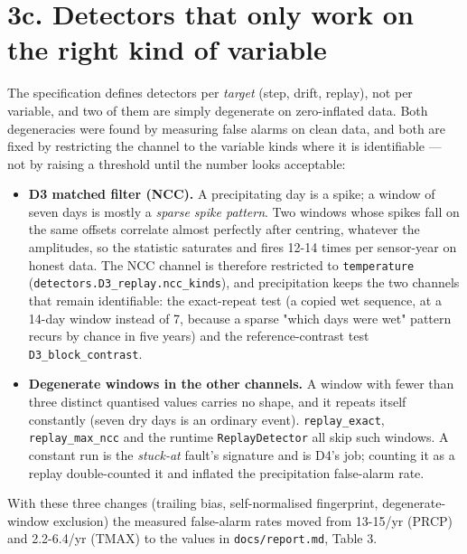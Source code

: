 \documentclass[10pt,a4paper]{article}
\begin{document}
\section*{3c. Detectors that only work on the right kind of variable}
The specification defines detectors per \emph{target} (step, drift, replay), not per variable, and two of them are simply degenerate on zero-\allowbreak{}inflated data. Both degeneracies were found by measuring false alarms on clean data, and both are fixed by restricting the channel to the variable kinds where it is identifiable — not by raising a threshold until the number looks acceptable:

\begin{itemize}
\item \textbf{D3 matched filter (NCC).} A precipitating day is a spike; a window of seven
days is mostly a \emph{sparse spike pattern}. Two windows whose spikes fall on the same offsets correlate almost perfectly after centring, whatever the amplitudes, so the statistic saturates and fires 12-\allowbreak{}14 times per sensor-\allowbreak{}year on honest data. The NCC channel is therefore restricted to \texttt{temperature} (\texttt{detectors.D3\_\allowbreak{}replay.ncc\_\allowbreak{}kinds}), and precipitation keeps the two channels that remain identifiable: the exact-\allowbreak{}repeat test (a copied wet sequence, at a 14-\allowbreak{}day window instead of 7, because a sparse "which days were wet" pattern recurs by chance in five years) and the reference-\allowbreak{}contrast test \texttt{D3\_\allowbreak{}block\_\allowbreak{}contrast}.

\item \textbf{Degenerate windows in the other channels.} A window with fewer than three
distinct quantised values carries no shape, and it repeats itself constantly (seven dry days is an ordinary event). \texttt{replay\_\allowbreak{}exact}, \texttt{replay\_\allowbreak{}max\_\allowbreak{}ncc} and the runtime \texttt{ReplayDetector} all skip such windows. A constant run is the \emph{stuck-\allowbreak{}at} fault's signature and is D4's job; counting it as a replay double-\allowbreak{}counted it and inflated the precipitation false-\allowbreak{}alarm rate.

\end{itemize}

With these three changes (trailing bias, self-\allowbreak{}normalised fingerprint, degenerate-\allowbreak{} window exclusion) the measured false-\allowbreak{}alarm rates moved from 13-\allowbreak{}15/\allowbreak{}yr (PRCP) and 2.2-\allowbreak{}6.4/\allowbreak{}yr (TMAX) to the values in \texttt{docs/\allowbreak{}report.md}, Table 3.
\end{document}
